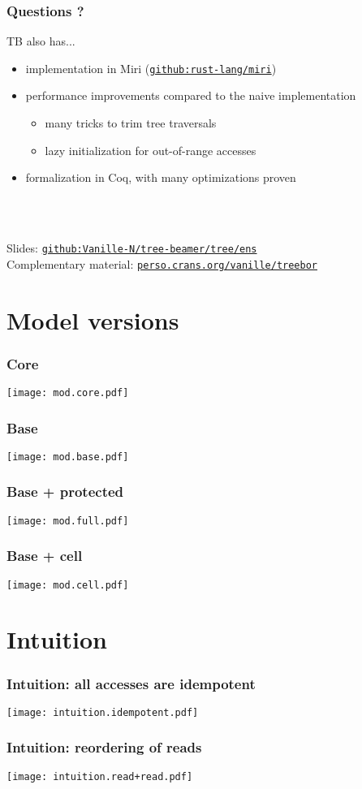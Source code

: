 \begin{frame}
    \frametitle{Questions ?}

    TB also has...
    \begin{itemize}
        \item implementation in Miri (\href{https://github.com/rust-lang/miri}{\texttt{github:rust-lang/miri}})
        \item performance improvements compared to the naive implementation
            \begin{itemize}
                \item many tricks to trim tree traversals
                \item lazy initialization for out-of-range accesses
            \end{itemize}
        \item formalization in Coq, with many optimizations proven
    \end{itemize}~\\~\\
    \vfill

    Slides: \href{https://github.com/Vanille-N/tree-beamer/tree/ens}{\texttt{github:Vanille-N/tree-beamer/tree/ens}}\\
    Complementary material: \href{https://perso.crans.org/vanille/treebor}{\texttt{perso.crans.org/vanille/treebor}}\\
\end{frame}

\appendix

\section{Model versions}

\begin{frame}
    \frametitle{Core}
    \texttt{[image: mod.core.pdf]}
\end{frame}

\begin{frame}
    \frametitle{Base}
    \texttt{[image: mod.base.pdf]}
\end{frame}

\begin{frame}
    \frametitle{Base + protected}
    \texttt{[image: mod.full.pdf]}
\end{frame}

\begin{frame}
    \frametitle{Base + cell}
    \texttt{[image: mod.cell.pdf]}
\end{frame}

\section{Intuition}

\begin{frame}
    \frametitle{Intuition: all accesses are idempotent}
    \texttt{[image: intuition.idempotent.pdf]}
\end{frame}

\begin{frame}
    \frametitle{Intuition: reordering of reads}
    \texttt{[image: intuition.read+read.pdf]}
\end{frame}
